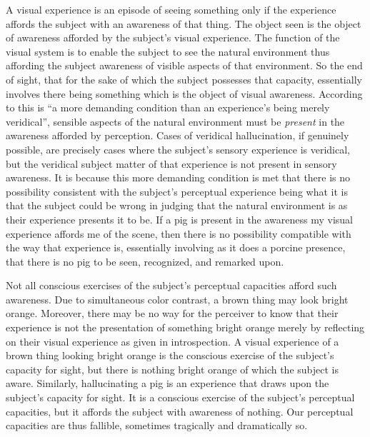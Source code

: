\documentclass[12pt]{article}
\begin{document}
A visual experience is an episode of seeing something only if the experience affords the subject with an awareness of that thing. The object seen is the object of awareness afforded by the subject's visual experience. The function of the visual system is to enable the subject to see the natural environment thus affording the subject awareness of visible aspects of that environment. So the end of sight, that for the sake of which the subject possesses that capacity, essentially involves there being something which is the object of visual awareness. According to \citet[245]{McDowell:2010fk} this is ``a more demanding condition than an experience's being merely veridical'', sensible aspects of the natural environment must be \emph{present} in the awareness afforded by perception. Cases of veridical hallucination, if genuinely possible, are precisely cases where the subject's sensory experience is veridical, but the veridical subject matter of that experience is not present in sensory awareness. It is because this more demanding condition is met that there is no possibility consistent with the subject's perceptual experience being what it is that the subject could be wrong in judging that the natural environment is as their experience presents it to be. If a pig is present in the awareness my visual experience affords me of the scene, then there is no possibility compatible with the way that experience is, essentially involving as it does a porcine presence, that there is no pig to be seen, recognized, and remarked upon.

Not all conscious exercises of the subject's perceptual capacities afford such awareness. Due to simultaneous color contrast, a brown thing may look bright orange. Moreover, there may be no way for the perceiver to know that their experience is not the presentation of something bright orange merely by reflecting on their visual experience as given in introspection. A visual experience of a brown thing looking bright orange is the conscious exercise of the subject's capacity for sight, but there is nothing bright orange of which the subject is aware. Similarly, hallucinating a pig is an experience that draws upon the subject's capacity for sight. It is a conscious exercise of the subject's perceptual capacities, but it affords the subject with awareness of nothing. Our perceptual capacities are thus fallible, sometimes tragically and dramatically so. 
\end{document}
